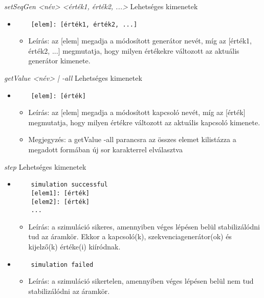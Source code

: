 \textit{setSeqGen <név> <érték1, érték2, ...>}\newline
Lehetséges kimenetek
\begin{itemize}
	\item 
	\begin{verbatim}
	[elem]: [érték1, érték2, ...]
	\end{verbatim}
	\begin{itemize}
		\item Leírás: az [elem] megadja a módosított generátor nevét, míg az [érték1, érték2, ...] megmutatja, hogy milyen értékekre változott az aktuális generátor kimenete. 
	\end{itemize}
\end{itemize}

\textit{getValue <név> | -all}\newline
Lehetséges kimenetek
\begin{itemize}
	\item
	\begin{verbatim}
	[elem]: [érték]
	\end{verbatim}
	\begin{itemize}
		\item Leírás: az [elem] megadja a módosított kapcsoló nevét, míg az [érték] megmutatja, hogy milyen értékre változott az aktuális kapcsoló kimenete.
		\item Megjegyzés: a getValue -all parancsra az összes elemet kilistázza a megadott formában új sor karakterrel elválasztva
	\end{itemize}
\end{itemize}

\textit{step}\newline
Lehetséges kimenetek
\begin{itemize}
	\item
	\begin{verbatim}
	simulation successful
	[elem1]: [érték]
	[elem2]: [érték]
	...
	\end{verbatim}
	\begin{itemize}
		\item Leírás: a szimuláció sikeres, amennyiben véges lépésen belül stabilizálódni tud az áramkör. Ekkor a kapcsoló(k), szekvenciagenerátor(ok) és kijelző(k) értéke(i) kiíródnak.
	\end{itemize}
	\item
	\begin{verbatim}
	simulation failed
	\end{verbatim}
	\begin{itemize}
		\item Leírás: a szimuláció sikertelen, amennyiben véges lépésen belül nem tud stabilizálódni az áramkör.
	\end{itemize}
\end{itemize}

